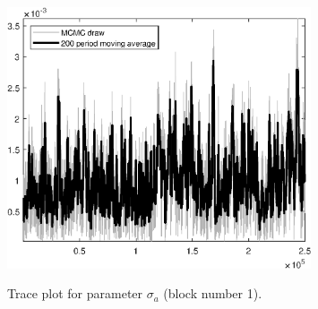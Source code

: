 \begin{figure}[H]
\centering
  \includegraphics[width=0.8\textwidth]{BRS_growth_ext_util/graphs/TracePlot_sigma_a_blck_1}\\
    \caption{Trace plot for parameter ${\sigma_a}$ (block number 1).}
\end{figure}
